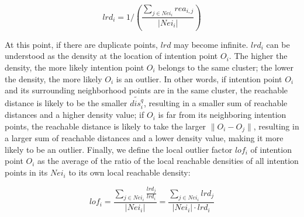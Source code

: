 \documentclass[lettersize,journal]{IEEEtran}
\begin{document}
\begin{equation}
lrd_i=1/(\frac{\sum_{j\in Nei_i} rea_{i,j}}{|Nei_i|})
\end{equation}

At this point, if there are duplicate points, $lrd$ may become infinite. $lrd_i$ can be understood as the density at the location of intention point $O_i$. The higher the density, the more likely intention point $O_i$ belongs to the same cluster; the lower the density, the more likely $O_i$ is an outlier. In other words, if intention point $O_i$ and its surrounding neighborhood points are in the same cluster, the reachable distance is likely to be the smaller $\widetilde{dis_i^q}$, resulting in a smaller sum of reachable distances and a higher density value; if $O_i$ is far from its neighboring intention points, the reachable distance is likely to take the larger $\|O_i-O_j\|$, resulting in a larger sum of reachable distances and a lower density value, making it more likely to be an outlier. Finally, we define the local outlier factor $lof_i$ of intention point $O_i$ as the average of the ratio of the local reachable densities of all intention points in its $Nei_i$ to its own local reachable density:

\begin{equation}
    lof_i=\frac{\sum_{j\in Nei_i}\frac{lrd_j}{lrd_i}}{|Nei_i|}=\frac{\sum_{j\in Nei_i} lrd_j}{|Nei_i|\cdot lrd_i}
\end{equation}
\end{document}
